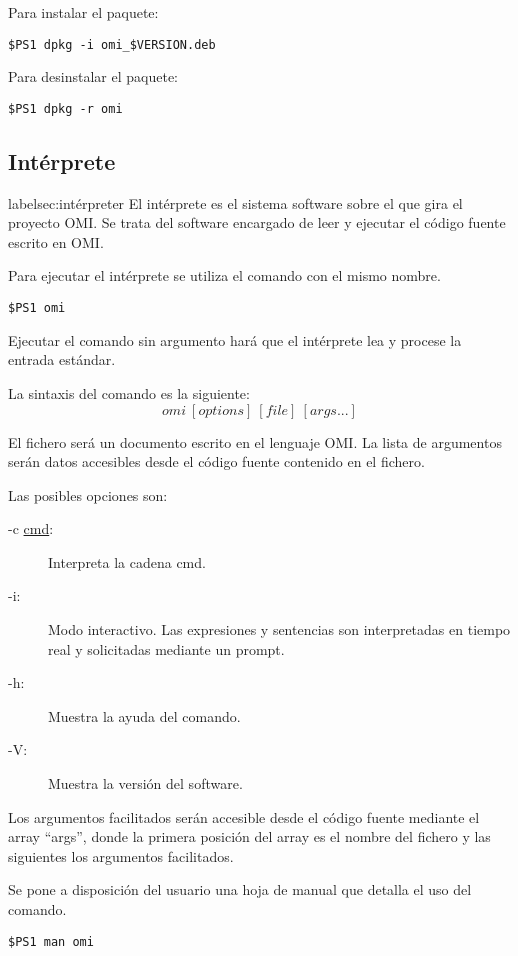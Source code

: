 Para instalar el paquete:
\begin{lstlisting}
$PS1 dpkg -i omi_$VERSION.deb
\end{lstlisting}

Para desinstalar el paquete:
\begin{lstlisting}
$PS1 dpkg -r omi
\end{lstlisting}

\subsection{Intérprete}label{sec:intérpreter}
El intérprete es el sistema software sobre el que gira el proyecto OMI. Se trata
del software encargado de leer y ejecutar el código fuente escrito en OMI.

Para ejecutar el intérprete se utiliza el comando con el mismo nombre.
 \begin{lstlisting}
$PS1 omi
\end{lstlisting}

Ejecutar el comando sin argumento hará que el intérprete lea y procese la entrada estándar.

La sintaxis del comando es la siguiente:
$$
omi\ [options]\ [file]\ [args...]
$$

El fichero será un documento escrito en el lenguaje OMI. La lista de argumentos serán datos accesibles
desde el código fuente contenido en el fichero.

Las posibles opciones son:
\begin{description} 
\item [-c \underline{cmd}:] Interpreta la cadena cmd.
\item [-i:] Modo interactivo. Las expresiones y sentencias son interpretadas en tiempo real y solicitadas mediante un prompt.
\item [-h:] Muestra la ayuda del comando.
\item [-V:] Muestra la versión del software.
\end{description}

Los argumentos facilitados serán accesible desde el código fuente mediante el array ``args'', donde la primera posición del array es
el nombre del fichero y las siguientes los argumentos facilitados.

Se pone a disposición del usuario una hoja de manual que detalla el uso del comando.
\begin{lstlisting}
$PS1 man omi
\end{lstlisting}

